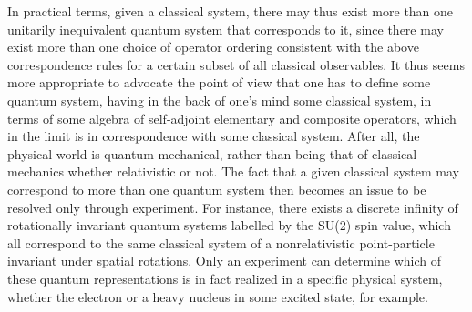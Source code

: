 \documentclass[a4paper,11pt]{article}
\begin{document}
In practical terms, given a classical 
system, there may thus exist more than one unitarily inequivalent quantum 
system that corresponds to it, since there may exist more than one choice
of operator ordering consistent with the above correspondence rules
for a certain subset of all classical observables\cite{Klaud2}. 
It thus seems more
appropriate to advocate the point of view that one has to define some
quantum system, having in the back of one's mind some classical system,
in terms of some algebra of self-adjoint elementary and composite
operators, which in the limit \coordHE{} is in correspondence
with some classical system. After all, the physical world is quantum 
mechanical, rather than being that of classical mechanics whether 
relativistic or not.
The fact that a given classical system may correspond to more than one 
quantum system then becomes an issue to be resolved only through experiment. 
For instance, there exists a discrete infinity of rotationally invariant 
quantum systems labelled by the SU(2) spin value, which all correspond to 
the same classical system of a nonrelativistic point-particle invariant 
under spatial rotations. Only an experiment can determine which of these
quantum representations is in fact realized in a specific physical system, 
whether the electron or a heavy nucleus in some excited state, for example.
\end{document}
